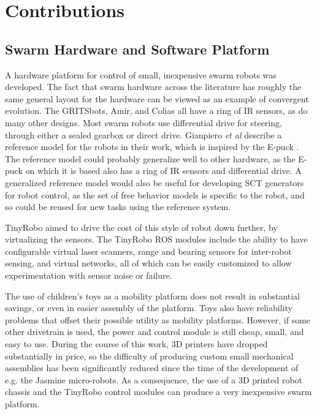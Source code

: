 \chapter{Contributions} \label{chapter:Contributions}

\section{Swarm Hardware and Software Platform}

A hardware platform for control of small, inexpensive swarm robots was developed. 
The fact that swarm hardware across the literature has roughly the same general layout for the hardware can be viewed as an example of convergent evolution. 
The GRITSbots, Amir, and Colias all have a ring of IR sensors, as do many other designs. 
Most swarm robots use differential drive for steering, through either a sealed gearbox or direct drive.
Gianpiero \emph{et al} describe a reference model for the robots in their work, which is inspired by the E-puck \citep{francesca2014automode}.
The reference model could probably generalize well to other hardware, as the E-puck on which it is based also has a ring of IR sensors and differential drive. 
A generalized reference model would also be useful for developing SCT generators for robot control, as the set of free behavior models is specific to the robot, and so could be reused for new tasks using the reference system. 

TinyRobo aimed to drive the cost of this style of robot down further, by virtualizing the sensors. 
The TinyRobo ROS modules include the ability to have configurable virtual laser scanners, range and bearing sensors for inter-robot sensing, and virtual networks, all of which can be easily customized to allow experimentation with sensor noise or failure. 

The use of children's toys as a mobility platform does not result in substantial savings, or even in easier assembly of the platform. 
Toys also have reliability problems that offset their possible utility as mobility platforms. 
However, if some other drivetrain is used, the power and control module is still cheap, small, and easy to use. During the course of this work, 3D printers have dropped substantially in price, so the difficulty of producing custom small mechanical assemblies has been significantly reduced since the time of the development of e.g. the Jasmine micro-robots. 
As a consequence, the use of a 3D printed robot chassis and the TinyRobo control modules can produce a very inexpensive swarm platform. 

